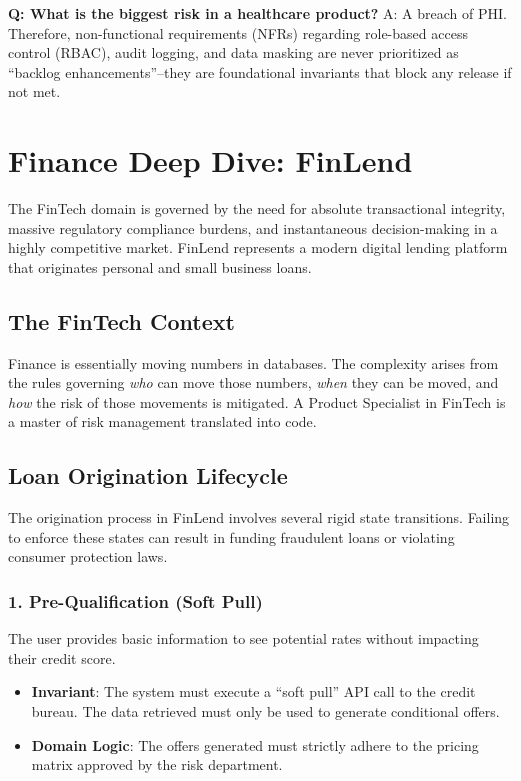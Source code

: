 \documentclass[
  11pt,
  openany,
  oneside]{book}
\providecommand{\tightlist}{%
  \setlength{\itemsep}{0pt}\setlength{\parskip}{0pt}}
\begin{document}
\textbf{Q: What is the biggest risk in a healthcare product?} A: A
breach of PHI. Therefore, non-functional requirements (NFRs) regarding
role-based access control (RBAC), audit logging, and data masking are
never prioritized as ``backlog enhancements''--they are foundational
invariants that block any release if not met.

\bigskip

\section{Finance Deep Dive: FinLend}\label{finance-deep-dive-finlend}

The FinTech domain is governed by the need for absolute transactional
integrity, massive regulatory compliance burdens, and instantaneous
decision-making in a highly competitive market. FinLend represents a
modern digital lending platform that originates personal and small
business loans.

\subsection{The FinTech Context}\label{the-fintech-context}

Finance is essentially moving numbers in databases. The complexity
arises from the rules governing \emph{who} can move those numbers,
\emph{when} they can be moved, and \emph{how} the risk of those
movements is mitigated. A Product Specialist in FinTech is a master of
risk management translated into code.

\subsection{Loan Origination
Lifecycle}\label{loan-origination-lifecycle}

The origination process in FinLend involves several rigid state
transitions. Failing to enforce these states can result in funding
fraudulent loans or violating consumer protection laws.

\subsubsection{1. Pre-Qualification (Soft
Pull)}\label{pre-qualification-soft-pull}

The user provides basic information to see potential rates without
impacting their credit score.

\begin{itemize}
\tightlist
\item
  \textbf{Invariant}: The system must execute a ``soft pull'' API call
  to the credit bureau. The data retrieved must only be used to generate
  conditional offers.
\item
  \textbf{Domain Logic}: The offers generated must strictly adhere to
  the pricing matrix approved by the risk department.
\end{itemize}
\end{document}
